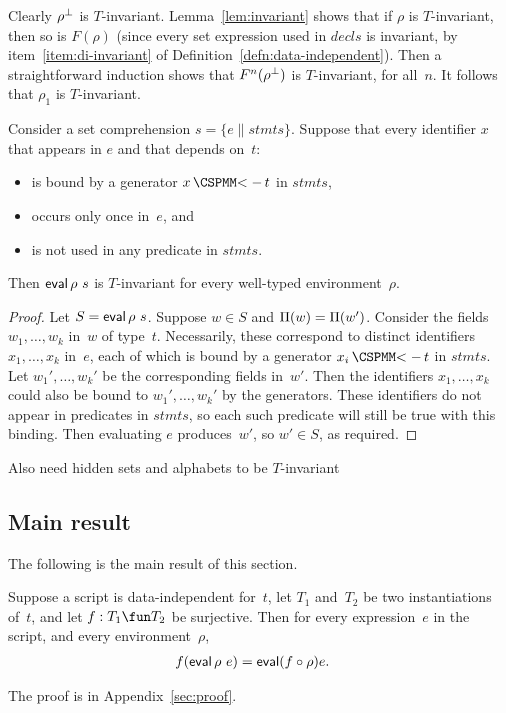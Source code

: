 Clearly $\rho^\perp$ is $T$-invariant.  Lemma~\ref{lem:invariant} shows that
if $\rho$ is $T$-invariant, then so is $F(\rho)$ (since every set expression
used in $decls$ is invariant, by item~\ref{item:di-invariant} of
Definition~\ref{defn:data-independent}).  Then a straightforward induction
shows that $F^n(\rho^\perp)$ is $T$-invariant, for all~$n$.  It follows that
$\rho_1$ is $T$-invariant.




\begin{lemma}
Consider a set comprehension $s = \{ e \| stmts\}$.  Suppose that every
identifier $x$ that appears in $e$ and that depends on~$t$:
%
\begin{itemize}
\item is bound by a generator $x \,\M{<-}\, t$ in $stmts$,
\item occurs only once in~$e$, and
\item is not used in any predicate in $stmts$.
\end{itemize}
%
Then $\mathop{\sf eval} \rho~s$ is $T$-invariant for every well-typed environment~$\rho$.
\end{lemma}


\begin{proof}
Let $S = \mathop{\sf eval} \rho~s$.  Suppose $w \in S$ and $\Pi(w) = \Pi(w')$.
Consider the fields $w_1,\ldots,w_k$ in~$w$ of type~$t$.  Necessarily, these
correspond to distinct identifiers $x_1,\ldots,x_k$ in~$e$, each of which is
bound by a generator $x_i \,\M{<-}\, t$ in $stmts$.  Let $w_1',\ldots,w_k'$ be
the corresponding fields in~$w'$.  Then the identifiers $x_1,\ldots,x_k$ could
also be bound to $w_1',\ldots,w_k'$ by the generators.  These identifiers do
not appear in predicates in $stmts$, so each such predicate will still be true
with this binding.  Then evaluating $e$ produces~$w'$, so $w' \in S$, as
required.
\end{proof}




\framebox{***} Also need hidden sets and alphabets to be $T$-invariant



\subsection{Main result}

The following is the main result of this section.
%
\begin{prop}
\label{prop:expressions}
Suppose a script is data-independent for~$t$, let $T_1$ and~$T_2$ be two
instantiations of~$t$, and let $f : T_1 \fun T_2$ be surjective.  Then for
every expression~$e$ in the script, and every environment~$\rho$,
\begin{eqnarray*}
f(\mathop{\sf eval} \rho ~ e) & = \mathop{\sf eval} (f \circ \rho) e .
\end{eqnarray*}
\end{prop}
%
The proof is in Appendix~\ref{sec:proof}.
